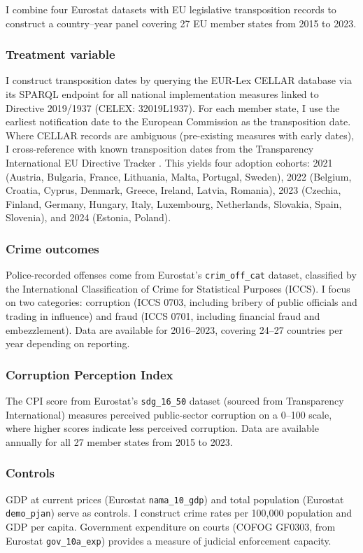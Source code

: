 \documentclass[12pt]{article}
\begin{document}
I combine four Eurostat datasets with EU legislative transposition records to construct a country--year panel covering 27 EU member states from 2015 to 2023.

\subsubsection*{Treatment variable} I construct transposition dates by querying the EUR-Lex CELLAR database via its SPARQL endpoint for all national implementation measures linked to Directive 2019/1937 (CELEX: 32019L1937). For each member state, I use the earliest notification date to the European Commission as the transposition date. Where CELLAR records are ambiguous (pre-existing measures with early dates), I cross-reference with known transposition dates from the Transparency International EU Directive Tracker \citep{transparency_intl_2023}. This yields four adoption cohorts: 2021 (Austria, Bulgaria, France, Lithuania, Malta, Portugal, Sweden), 2022 (Belgium, Croatia, Cyprus, Denmark, Greece, Ireland, Latvia, Romania), 2023 (Czechia, Finland, Germany, Hungary, Italy, Luxembourg, Netherlands, Slovakia, Spain, Slovenia), and 2024 (Estonia, Poland).

\subsubsection*{Crime outcomes} Police-recorded offenses come from Eurostat's \texttt{crim\_off\_cat} dataset, classified by the International Classification of Crime for Statistical Purposes (ICCS). I focus on two categories: corruption (ICCS 0703, including bribery of public officials and trading in influence) and fraud (ICCS 0701, including financial fraud and embezzlement). Data are available for 2016--2023, covering 24--27 countries per year depending on reporting.

\subsubsection*{Corruption Perception Index} The CPI score from Eurostat's \texttt{sdg\_16\_50} dataset (sourced from Transparency International) measures perceived public-sector corruption on a 0--100 scale, where higher scores indicate less perceived corruption. Data are available annually for all 27 member states from 2015 to 2023.

\subsubsection*{Controls} GDP at current prices (Eurostat \texttt{nama\_10\_gdp}) and total population (Eurostat \texttt{demo\_pjan}) serve as controls. I construct crime rates per 100,000 population and GDP per capita. Government expenditure on courts (COFOG GF0303, from Eurostat \texttt{gov\_10a\_exp}) provides a measure of judicial enforcement capacity.
\end{document}
